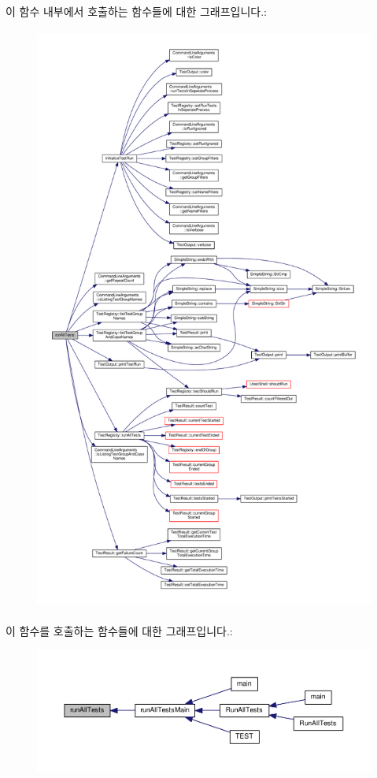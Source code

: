 이 함수 내부에서 호출하는 함수들에 대한 그래프입니다.\+:
\nopagebreak
\begin{figure}[H]
\begin{center}
\leavevmode
\includegraphics[height=550pt]{class_command_line_test_runner_a4d48613a805eeffb0369f61bb0328b37_cgraph}
\end{center}
\end{figure}




이 함수를 호출하는 함수들에 대한 그래프입니다.\+:
\nopagebreak
\begin{figure}[H]
\begin{center}
\leavevmode
\includegraphics[width=350pt]{class_command_line_test_runner_a4d48613a805eeffb0369f61bb0328b37_icgraph}
\end{center}
\end{figure}


